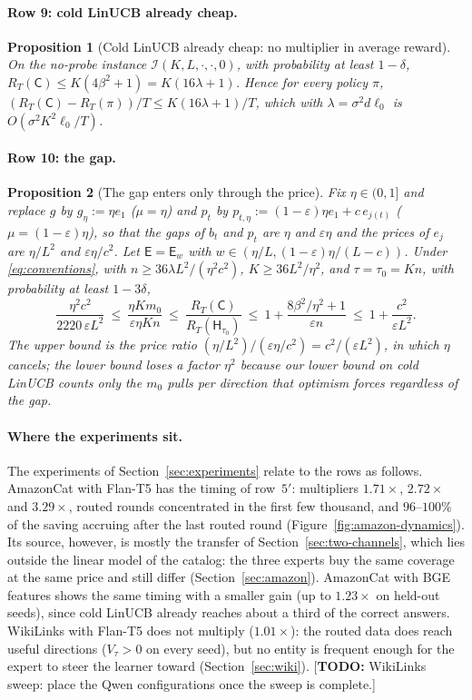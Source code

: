 \documentclass{article}
\newtheorem{proposition}{Proposition}
\theoremstyle{definition}
\theoremstyle{remark}
\newcommand{\eps}{\varepsilon}
\theoremstyle{remark}
\newcommand{\todo}[1]{\textcolor{red!70!black}{[\textbf{TODO:} #1]}}
\newcommand{\Cold}{\mathsf{C}}
\newcommand{\Exp}{\mathsf{E}}
\newcommand{\Hyb}{\mathsf{H}}
\begin{document}
\paragraph{Row 9: cold LinUCB already cheap.}
\begin{proposition}[Cold LinUCB already cheap: no multiplier in average reward]
\label{prop:cat-cheap}
On the no-probe instance $\mathcal I(K,L,\cdot,\cdot,0)$, with probability
at least $1-\delta$, $R_T(\Cold)\le K(4\beta^2+1)=K(16\lambda+1)$. Hence for
\emph{every} policy $\pi$, $(R_T(\Cold)-R_T(\pi))/T\le K(16\lambda+1)/T$, which with
$\lambda=\sigma^2d\ell_0$ is $O(\sigma^2K^2\ell_0/T)$.
\end{proposition}

\paragraph{Row 10: the gap.}
\begin{proposition}[The gap enters only through the price]
\label{prop:cat-gap}
Fix $\eta\in(0,1]$ and replace $g$ by $g_\eta:=\eta e_1$ ($\mu=\eta$) and
$p_t$ by $p_{t,\eta}:=(1-\eps)\eta e_1+c\,e_{j(t)}$ ($\mu=(1-\eps)\eta$), so that
the gaps of $b_t$ and $p_t$ are $\eta$ and $\eps\eta$ and the prices of
$e_j$ are $\eta/L^2$ and $\eps\eta/c^2$. Let $\Exp=\Exp_w$ with
$w\in(\eta/L,(1-\eps)\eta/(L-c))$. Under \eqref{eq:conventions}, with
$n\ge36\lambda L^2/(\eta^2c^2)$, $K\ge36L^2/\eta^2$, and $\tau=\tau_0=Kn$, with
probability at least $1-3\delta$,
\[
\frac{\eta^2c^2}{2220\,\eps L^2}\ \le\ \frac{\eta Km_0}{\eps\eta Kn}\ \le\
\frac{R_T(\Cold)}{R_T(\Hyb_{\tau_0})}\ \le\ 1+\frac{8\beta^2/\eta^2+1}{\eps n}\ \le\ 1+\frac{c^2}{\eps L^2}.
\]
The upper bound is the price ratio $(\eta/L^2)/(\eps\eta/c^2)=c^2/(\eps L^2)$,
in which $\eta$ cancels; the lower bound loses a factor $\eta^2$ because our
lower bound on cold LinUCB counts only the $m_0$ pulls per direction that
optimism forces regardless of the gap.
\end{proposition}

\paragraph{Where the experiments sit.}
The experiments of Section~\ref{sec:experiments} relate to the rows as
follows. AmazonCat with Flan-T5 has the timing of row~$5'$: multipliers
$1.71\times$, $2.72\times$ and $3.29\times$, routed rounds concentrated in the
first few thousand, and $96$--$100\%$ of the saving accruing after the last
routed round (Figure~\ref{fig:amazon-dynamics}). Its source, however, is
mostly the transfer of Section~\ref{sec:two-channels}, which lies outside the
linear model of the catalog: the three experts buy the same coverage at the
same price and still differ (Section~\ref{sec:amazon}). AmazonCat with BGE
features shows the same timing with a smaller gain (up to $1.23\times$ on
held-out seeds), since cold LinUCB already reaches about a third of the
correct answers. WikiLinks with Flan-T5 does not multiply ($1.01\times$): the
routed data does reach useful directions ($V_\tau>0$ on every seed), but no
entity is frequent enough for the expert to steer the learner toward
(Section~\ref{sec:wiki}). \todo{WikiLinks sweep: place the Qwen
configurations once the sweep is complete.}
\end{document}
